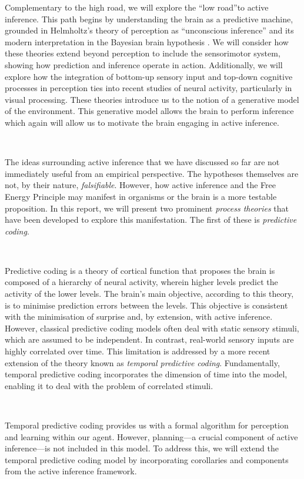 \documentclass{article}
\begin{document}
Complementary to the high road, we will explore the ``low road''to active inference. This path begins by understanding the brain as a predictive machine, grounded in Helmholtz's theory of perception as ``unconscious inference''\citep{helmholtz1867concerning} and its modern interpretation in the Bayesian brain hypothesis \citep{doya2007bayesian}. We will consider how these theories extend beyond perception to include the sensorimotor system, showing how prediction and inference operate in action. Additionally, we will explore how the integration of bottom-up sensory input and top-down cognitive processes in perception ties into recent studies of neural activity, particularly in visual processing. These theories introduce us to the notion of a generative model of the environment. This generative model allows the brain to perform inference which again will allow us to motivate the brain engaging in active inference.

\

The ideas surrounding active inference that we have discussed so far are not immediately useful from an empirical perspective. The hypotheses themselves are not, by their nature, \textit{falsifiable}. However, how active inference and the Free Energy Principle may manifest in organisms or the brain is a more testable proposition. In this report, we will present two prominent \textit{process theories} that have been developed to explore this manifestation. The first of these is \textit{predictive coding}.

\

Predictive coding is a theory of cortical function that proposes the brain is composed of a hierarchy of neural activity, wherein higher levels predict the activity of the lower levels. The brain’s main objective, according to this theory, is to minimise prediction errors between the levels. This objective is consistent with the minimisation of surprise and, by extension, with active inference. However, classical predictive coding models often deal with static sensory stimuli, which are assumed to be independent. In contrast, real-world sensory inputs are highly correlated over time. This limitation is addressed by a more recent extension of the theory known as \textit{temporal predictive coding}. Fundamentally, temporal predictive coding incorporates the dimension of time into the model, enabling it to deal with the problem of correlated stimuli.

\

Temporal predictive coding provides us with a formal algorithm for perception and learning within our agent. However, planning—a crucial component of active inference—is not included in this model. To address this, we will extend the temporal predictive coding model by incorporating corollaries and components from the active inference framework.
\end{document}
